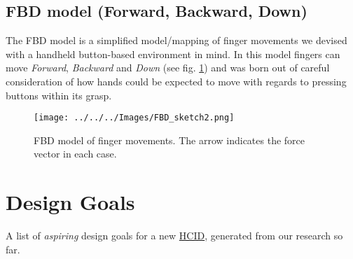 \documentclass[logo,bsc,singlespacing,parskip]{infthesis}
\begin{document}
\section{FBD model (Forward, Backward, Down)}
\label{sec:org224b0c4}
The FBD model is a simplified model/mapping of finger movements we devised with a handheld button-based environment in mind.
In this model fingers can move \emph{Forward}, \emph{Backward} and \emph{Down} (see fig. \ref{fig:FBD}) and was born out of careful consideration of how hands could be expected to move with regards to pressing buttons within its grasp.

\begin{figure}[ht]
\centering
\texttt{[image: ../../../Images/FBD\_sketch2.png]}
\caption[FBD model of finger movements]{\label{fig:FBD}FBD model of finger movements. The arrow indicates the force vector in each case.}
\end{figure}
\chapter{Design Goals}
\label{sec:org4b2d6f2}
A list of \emph{aspiring} design goals for a new \hyperref[org917851e]{HCID}, generated from our research so far.
\smallskip
\end{document}
